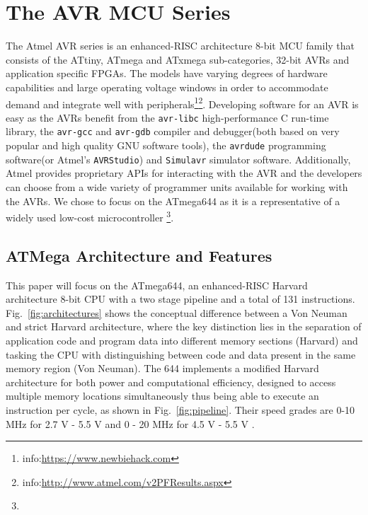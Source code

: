 \section{The AVR MCU Series}
\label{sec:atmega_overview}

	The Atmel AVR series is an enhanced-RISC architecture 8-bit MCU family that consists of the ATtiny, ATmega and ATxmega sub-categories,  32-bit AVRs and application specific FPGAs\cite{book:practical_avr}. The models have varying degrees of hardware capabilities and large operating voltage windows in order to accommodate demand and integrate well with peripherals\footnote{info:\href{https://www.newbiehack.com/MicrocontrollersAlternativePowerSources.aspx}{https://www.newbiehack.com}}\footnote{info:\href{http://www.atmel.com/v2PFResults.aspx}{http://www.atmel.com/v2PFResults.aspx}}. Developing software for an AVR is easy as the AVRs benefit from the  \texttt{avr-libc} high-performance C run-time library, the \texttt{avr-gcc} and \texttt{avr-gdb} compiler and debugger(both based on very popular and high quality GNU software tools), the \texttt{avrdude} programming software(or Atmel's \texttt{AVRStudio}) and \texttt{Simulavr} simulator software. Additionally, Atmel provides proprietary APIs for interacting with the AVR and the developers can choose from a wide variety of programmer units available for working with the AVRs\cite{book:practical_avr}. We chose to focus on the ATmega644 as it is a representative of a widely used low-cost microcontroller \citep{glitches_paper}\footnote{}.
	
	\subsection{ATMega Architecture and Features}				

	This paper will focus on the ATmega644, an enhanced-RISC Harvard architecture 8-bit CPU with a two stage pipeline and a total of 131 instructions. Fig.~\ref{fig:architectures} shows the conceptual difference between a Von Neuman and strict Harvard architecture, where the key distinction lies in the separation of application code and program data into different memory sections (Harvard) and tasking the CPU with distinguishing between code and data present in the same memory region (Von Neuman). The 644 implements a modified Harvard architecture for both power and computational efficiency, designed to access multiple memory locations simultaneously thus being able to execute an instruction per cycle, as shown in Fig.~\ref{fig:pipeline}. Their speed grades are  0-10 MHz for 2.7 V - 5.5 V and 0 - 20 MHz for 4.5 V - 5.5 V \citep{atmega_manual}.

